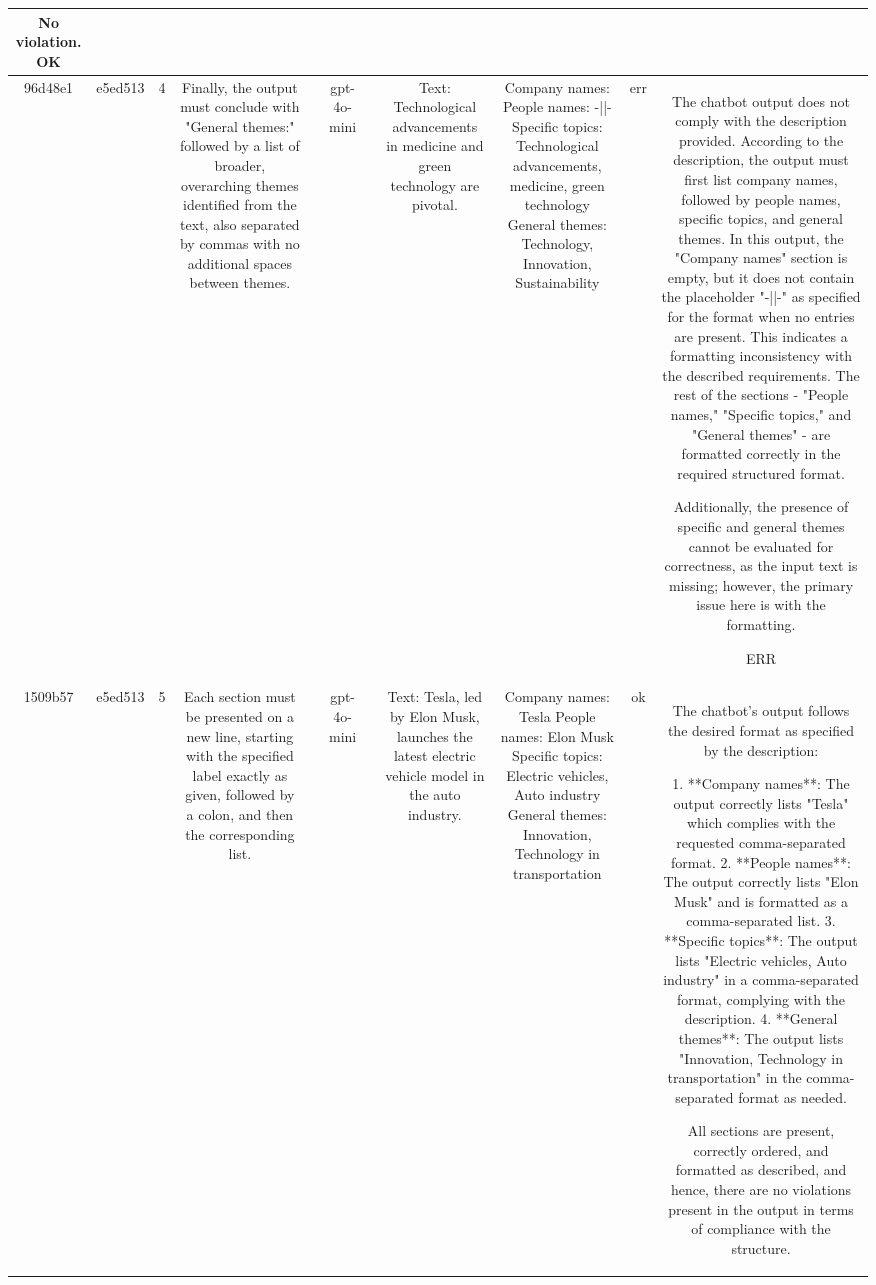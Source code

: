 \begin{table}[h!]
\begin{tabular}{|c|c|c|c|c|c|c|c|c|c|c|}
No violation.
OK\\
\hline
96d48e1 & e5ed513 & 4 & Finally, the output must conclude with "General themes:" followed by a list of broader, overarching themes identified from the text, also separated by commas with no additional spaces between themes. &  & gpt-4o-mini &  & Text: Technological advancements in medicine and green technology are pivotal. & Company names: 
People names: -||-
Specific topics: Technological advancements, medicine, green technology
General themes: Technology, Innovation, Sustainability & err & The chatbot output does not comply with the description provided. According to the description, the output must first list company names, followed by people names, specific topics, and general themes. In this output, the "Company names" section is empty, but it does not contain the placeholder "-||-" as specified for the format when no entries are present. This indicates a formatting inconsistency with the described requirements. The rest of the sections - "People names," "Specific topics," and "General themes" - are formatted correctly in the required structured format. 

Additionally, the presence of specific and general themes cannot be evaluated for correctness, as the input text is missing; however, the primary issue here is with the formatting.

ERR\\
\hline
1509b57 & e5ed513 & 5 & Each section must be presented on a new line, starting with the specified label exactly as given, followed by a colon, and then the corresponding list. &  & gpt-4o-mini &  & Text: Tesla, led by Elon Musk, launches the latest electric vehicle model in the auto industry. & Company names: Tesla  
People names: Elon Musk  
Specific topics: Electric vehicles, Auto industry  
General themes: Innovation, Technology in transportation & ok & The chatbot's output follows the desired format as specified by the description:

1. **Company names**: The output correctly lists "Tesla" which complies with the requested comma-separated format.
2. **People names**: The output correctly lists "Elon Musk" and is formatted as a comma-separated list.
3. **Specific topics**: The output lists "Electric vehicles, Auto industry" in a comma-separated format, complying with the description.
4. **General themes**: The output lists "Innovation, Technology in transportation" in the comma-separated format as needed.

All sections are present, correctly ordered, and formatted as described, and hence, there are no violations present in the output in terms of compliance with the structure.


\end{tabular}
\end{table}

